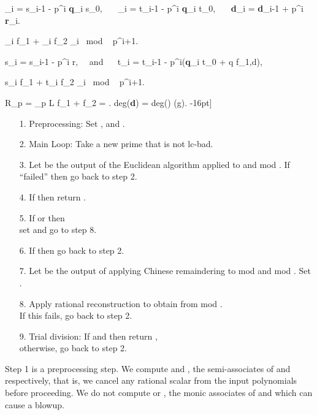 \documentclass[10pt]{article}
\begin{document}
	_i = s_{i-1} - p^i {\bf \rm q}_i s_0, \ \ \ 
	_i = t_{i-1} - p^i {\bf \rm q}_i t_0, \ \ \
	{\bf d}_i = {\bf d}_{i-1} + p^i {\bf \rm r}_i.

	_i f_1 + _i f_2 _i {\rm \ mod \ } p^{i+1}.

	s_i = s_{i-1} - p^i r, {\rm \ \ and \ \ }
	t_i = t_{i-1} - p^i({\bf \rm q}_i t_0 + q f_{1,d}),

	s_i f_1 + t_i f_2 _i {\rm \ mod \ } p^{i+1}.

	\label{intersection}
	R_p = _p \bigcap L
 f_1 + f_2 = . 	  {\rm deg}({\bf d})
	= {\rm deg}(\hat{\bf d}) (g).
-16pt]
\begin{itemize}
\item[1.] Preprocessing: Set ,  and .
\vspace*{-2mm}
\item[2.] Main Loop: Take a new prime  that is not lc-bad.
\vspace*{-2mm}
\item[3.] Let  be the output of the Euclidean algorithm applied
          to  and  mod .
          If ``failed'' then go back to step 2.
\vspace*{-2mm}
\item[4.] If  then return .
\vspace*{-2mm}
\item[5.] If  or  then \\
          set  and go to step 8.
\vspace*{-2mm}
\item[6.] If  then go back to step 2.
\vspace*{-2mm}
\item[7.] Let  be the output of applying Chinese remaindering to  mod  and
           mod .  Set .
\vspace*{-2mm}
\item[8.] Apply rational reconstruction to obtain  from  mod . \\
          If this fails, go back to step 2.
\vspace*{-2mm}
\item[9.] Trial division: If  and  then return , \\
          otherwise, go back to step 2.
\end{itemize}


\medskip
\noindent
Step 1 is a preprocessing step.  We compute  and ,
the semi-associates of  and  respectively, that is,
we cancel any rational scalar from the input polynomials before proceeding.
We do not compute  or , the monic
associates of  and  which can cause a blowup.
\end{document}
